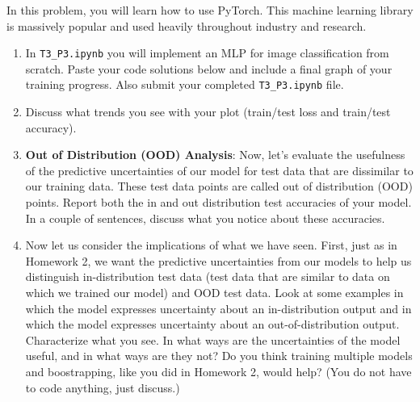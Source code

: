 \documentclass[submit]{harvardml}
\begin{document}
\begin{problem}

In this problem, you will learn how to use PyTorch. This machine learning library is massively popular and used heavily throughout industry and research.


\begin{enumerate}
  \item In \verb|T3_P3.ipynb| you will implement an MLP for image classification from scratch. Paste your code solutions below and include a final graph of your training progress. Also submit your completed \verb|T3_P3.ipynb| file.
  \item Discuss what trends you see with your plot (train/test loss and train/test accuracy).

  \item \textbf{Out of Distribution (OOD) Analysis}: Now, let's evaluate the usefulness of the predictive uncertainties of our model for test data that are dissimilar to our training data. These test data points are called out of distribution (OOD) points. Report both the in and out distribution test accuracies of your model. In a couple of sentences, discuss what you notice about these accuracies.

  \item Now let us consider the implications of what we have seen.  First, just as in Homework 2, we want the predictive uncertainties from our models to help us distinguish in-distribution test data (test data that are similar to data on which we trained our model) and OOD test data.  Look at some examples in which the model expresses uncertainty about an in-distribution output and in which the model expresses uncertainty about an out-of-distribution output.  Characterize what you see.  In what ways are the uncertainties of the model useful, and in what ways are they not?  Do you think training multiple models and boostrapping, like you did in Homework 2, would help?  (You do not have to code anything, just discuss.)


\end{enumerate}
\end{problem}
\end{document}
